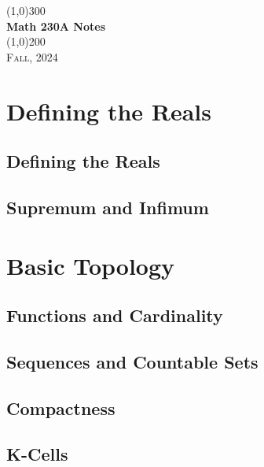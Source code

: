 \documentclass[a4paper, openany]{book}
\begin{document}
\begin{titlepage}
    \begin{center}
        \line(1,0){300} \\
        [0.25in]
        \huge{\bfseries Math 230A Notes} \\
        [2mm]
        \line(1,0){200} \\
        [1.5cm]
        \textsc{\LARGE Fall, 2024}
    \end{center}
\end{titlepage}

\tableofcontents
\setcounter{section}{0}

\chapter{Defining the Reals}
\section{Defining the Reals}

\newpage

\section{Supremum and Infimum}

\newpage

\chapter{Basic Topology}
\section{Functions and Cardinality}

\newpage

\section{Sequences and Countable Sets}

\newpage

\section{Compactness}

\newpage

\section{K-Cells}

\newpage
\end{document}

